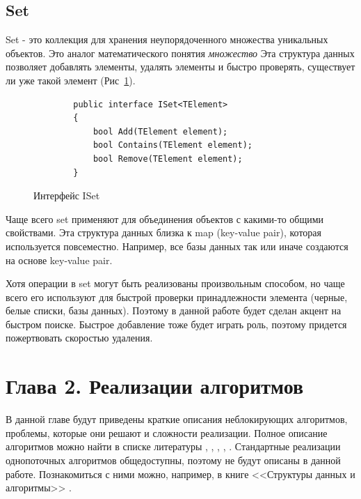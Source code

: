 \documentclass[12pt]{article}
\begin{document}
{			\subsection{Set}
				\par Set - это коллекция для хранения неупорядоченного множества уникальных объектов. Это аналог математического понятия \textit{множество} Эта структура данных позволяет добавлять элементы, удалять элементы и быстро проверять, существует ли уже такой элемент (Рис~\ref{pic:Set}). 
				\begin{figure}[h]
					\begin{lstlisting}
		public interface ISet<TElement>
		{
			bool Add(TElement element);
			bool Contains(TElement element);
			bool Remove(TElement element);
		}
					\end{lstlisting}
					\caption{Интерфейс ISet}
					\label{pic:Set}
				\end{figure}
				\par Чаще всего set применяют для объединения объектов с какими-то общими свойствами. Эта структура данных близка к map (key-value pair), которая используется повсеместно. Например, все базы данных так или иначе создаются на основе key-value pair.  
				\par Хотя операции в set могут быть реализованы произвольным способом, но чаще всего его используют для быстрой проверки принадлежности элемента (черные, белые списки, базы данных). Поэтому в данной работе будет сделан акцент на быстром поиске. Быстрое добавление тоже будет играть роль, поэтому придется пожертвовать скоростью удаления.
		\newpage
		
		\section{Глава 2. Реализации алгоритмов}
			\par В данной главе будут приведены краткие описания неблокирующих алгоритмов, проблемы, которые они решают и сложности реализации. Полное описание алгоритмов можно найти в списке литературы \cite{LinkedList}, \cite{ListSkipList}, \cite{ListAndSkipList}, \cite{HashTable}, \cite{artOfMultiprocessor}. Стандартные реализации однопоточных алгоритмов общедоступны, поэтому не будут описаны в данной работе. Познакомиться с ними можно, например, в книге <<Структуры данных и алгоритмы>> \cite{dataStructures}.
}
\end{document}
